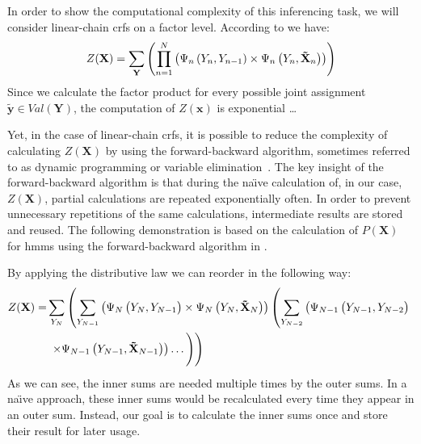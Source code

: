 \bigskip

In order to show the computational complexity of this inferencing task, we will consider \glspl{linear-chain crf} on a \gls{factor} level.
According to  we have:
\begin{equation}
  \label{equ:linear-chain-crf-z}
  Z(\mathbf{X}) = \sum_{\mathbf{Y}}\left(\prod_{n=1}^{N}\left(\Psi_n\left(\vphantom{\tilde{x}}Y_n,Y_{n-1}\right)\times\Psi_n\left(Y_n,\mathbf{\tilde{X}}_n\right)\right)\right)
\end{equation}
Since we calculate the \gls{factor product} for every possible joint assignment $\mathbf{\tilde{y}}\in Val(\mathbf{Y})$, the computation of $Z(\mathbf{x})$ is exponential \dots{}

Yet, in the case of \glspl{linear-chain crf}, it is possible to reduce the complexity of calculating $Z(\mathbf{X})$ by using the forward-backward algorithm, sometimes referred to as dynamic programming or variable elimination~\citep{sutton2010introduction,koller2009probabilistic}.
The key insight of the forward-backward algorithm is that during the na\"{\i}ve calculation of, in our case, $Z(\mathbf{X})$, partial calculations are repeated exponentially often.
In order to prevent unnecessary repetitions of the same calculations, intermediate results are stored and reused.
The following demonstration is based on the calculation of $P(\mathbf{X})$ for \glspl{hmm} using the forward-backward algorithm in \citet{sutton2010introduction}.

\bigskip

By applying the distributive law we can reorder  in the following way:
\begin{equation}
  \label{equ:linear-chain-crf-z-distributive}
  \begin{split}
    Z(\mathbf{X}) = & \sum_{Y_N}\left(\sum_{Y_{N-1}}\left(\Psi_N\left(\vphantom{\tilde{X}}Y_N,Y_{N-1}\right)\times\Psi_N\left(Y_N,\mathbf{\tilde{X}}_N\right)\right)\left(\sum_{Y_{N-2}}\left(\Psi_{N-1}\left(\vphantom{\tilde{X}}Y_{N-1},Y_{N-2}\right)\right.\right.\right.\\
    & \left.\left.\left.\times\Psi_{N-1}\left(Y_{N-1},\mathbf{\tilde{X}}_{N-1}\right)\right)\dots\vphantom{\sum_{Y_N}}\right)\right)
  \end{split}
\end{equation}
As we can see, the inner sums are needed multiple times by the outer sums.
In a na\"{\i}ve approach, these inner sums would be recalculated every time they appear in an outer sum.
Instead, our goal is to calculate the inner sums once and store their result for later usage.

